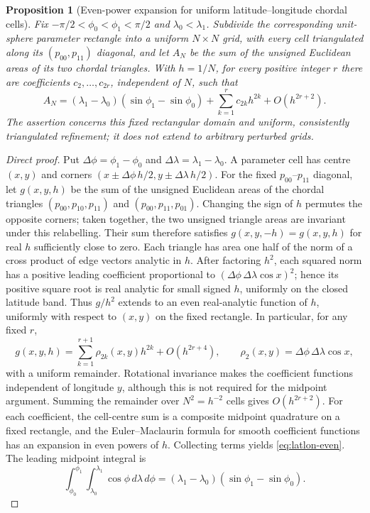 \documentclass[11pt]{article}
\newtheorem{proposition}{Proposition}
\theoremstyle{remark}
\begin{document}
\begin{proposition}[Even-power expansion for uniform latitude--longitude chordal cells]
\label{prop:latlon-even}
Fix $-\pi/2<\phi_0<\phi_1<\pi/2$ and $\lambda_0<\lambda_1$.
Subdivide the corresponding unit-sphere parameter rectangle into a uniform
$N\times N$ grid, with every cell triangulated along its $(p_{00},p_{11})$
diagonal, and let $A_N$ be the sum of the unsigned Euclidean areas of its two
chordal triangles. With $h=1/N$, for every positive integer $r$ there are
coefficients $c_{2},\ldots,c_{2r}$, independent of $N$, such that
\begin{equation}\label{eq:latlon-even}
 A_N=(\lambda_1-\lambda_0)(\sin\phi_1-\sin\phi_0)
       +\sum_{k=1}^{r}c_{2k}h^{2k}+O(h^{2r+2}).
\end{equation}
The assertion concerns this fixed rectangular domain and uniform, consistently
triangulated refinement; it does not extend to arbitrary perturbed grids.
\end{proposition}
\begin{proof}[Direct proof]
Put $\Delta\phi=\phi_1-\phi_0$ and $\Delta\lambda=\lambda_1-\lambda_0$.
A parameter cell has centre $(x,y)$ and corners
$(x\pm\Delta\phi\,h/2,y\pm\Delta\lambda\,h/2)$.
For the fixed $p_{00}$--$p_{11}$ diagonal, let $g(x,y,h)$ be the sum of the
unsigned Euclidean areas of the chordal triangles
$(p_{00},p_{10},p_{11})$ and $(p_{00},p_{11},p_{01})$.
Changing the sign of $h$ permutes the opposite corners; taken together, the
two unsigned triangle areas are invariant under this relabelling. Their sum therefore satisfies
$g(x,y,-h)=g(x,y,h)$ for real $h$ sufficiently close to zero.
Each triangle has area one half of the norm of a cross product of edge
vectors analytic in $h$. After factoring $h^2$, each squared norm has a
positive leading coefficient proportional to
$(\Delta\phi\,\Delta\lambda\cos x)^2$; hence its positive square root
is real analytic for small signed $h$, uniformly on the closed latitude band. Thus $g/h^2$
extends to an even real-analytic function of $h$, uniformly with respect to $(x,y)$ on the
fixed rectangle. In particular, for any fixed $r$,
\[
 g(x,y,h)=\sum_{k=1}^{r+1}\rho_{2k}(x,y)h^{2k}
                +O(h^{2r+4}),\qquad
 \rho_2(x,y)=\Delta\phi\,\Delta\lambda\cos x,
\]
with a uniform remainder. Rotational invariance makes the coefficient
functions independent of longitude $y$, although this is not required for
the midpoint argument.
Summing the remainder over $N^2=h^{-2}$ cells gives
$O(h^{2r+2})$. For each coefficient, the cell-centre sum is a composite
midpoint quadrature on a fixed rectangle, and the Euler--Maclaurin formula
for smooth coefficient functions has an expansion in even powers of $h$.
Collecting terms yields \eqref{eq:latlon-even}. The leading midpoint integral
is
\[
 \int_{\phi_0}^{\phi_1}\int_{\lambda_0}^{\lambda_1}
            \cos\phi\,d\lambda\,d\phi
 = (\lambda_1-\lambda_0)(\sin\phi_1-\sin\phi_0).
\]
\end{proof}
\end{document}
